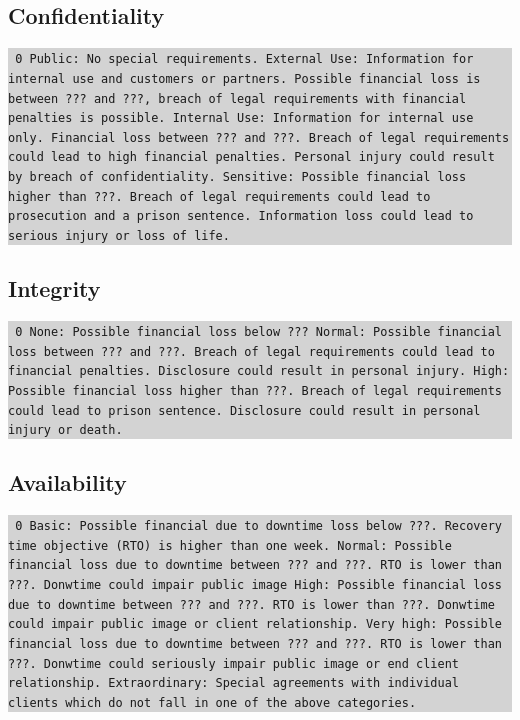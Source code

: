 \documentclass[a4paper,10pt]{book}
\begin{document}
\subsection{Confidentiality}
\colorbox{lightgray}{\parbox{\textwidth}{
{\tt
0 Public: No special requirements.
\newline{} External Use: Information for internal use and customers or partners.
Possible financial loss is between ??? and ???, breach of legal requirements
with financial penalties is possible.
\newline{} Internal Use: Information for internal use only. Financial loss between ???
and ???. Breach of legal requirements could lead to high financial penalties.
Personal injury could result by breach of confidentiality.
\newline{} Sensitive: Possible financial loss higher than ???. Breach of legal
requirements could lead to prosecution and a prison sentence. Information loss
could lead to serious injury or loss of life.}
}}

\subsection{Integrity}
\colorbox{lightgray}{\parbox{\textwidth}{
{\tt
0 None: Possible financial loss below ???
\newline{} Normal: Possible financial loss between ??? and ???. Breach of legal
requirements could lead to financial penalties. Disclosure could result in
personal injury.
\newline{} High: Possible financial loss higher than ???. Breach of legal requirements
could lead to prison sentence. Disclosure could result in personal injury or
death.}
}}

\subsection{Availability}
\colorbox{lightgray}{\parbox{\textwidth}{
{\tt
0 Basic: Possible financial due to downtime loss below ???. Recovery time
objective (RTO) is higher than one week.
\newline{} Normal: Possible financial loss due to downtime  between ??? and ???. RTO is
lower than ???. Donwtime could impair public image
\newline{} High: Possible financial loss due to downtime  between ??? and ???. RTO is
lower than ???. Donwtime could impair public image or client relationship.
\newline{} Very high: Possible financial loss due to downtime  between ??? and ???. RTO
is lower than ???. Donwtime could seriously impair public image or end client
relationship.
\newline{} Extraordinary: Special agreements with individual clients which do not fall
in one of the above categories.}
}}
\end{document}
